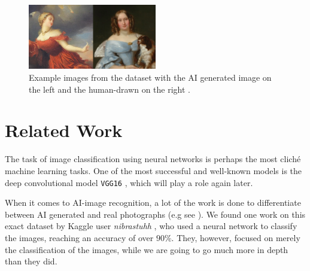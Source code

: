 \begin{figure}[H]
    \centering
    \includegraphics[width=0.5\textwidth]{images/Example_images.png}
    \caption{Example images from the dataset with the AI generated image on the left and the human-drawn on the right \cite{aiartbench}.}
    \label{fig:example_images}
\end{figure}

\section{Related Work}

The task of image classification using neural networks is perhaps the most cliché machine learning tasks.
One of the most successful and well-known models is the deep convolutional model \texttt{VGG16} \cite{VGG16source}, which will play a role again later.

When it comes to AI-image recognition, a lot of the work is done to differentiate between AI generated and real photographs (e.g see \cite{photos_example}).
We found one work on this exact dataset by Kaggle user \textit{nibrastuhh} \cite{useraiartbench}, who used
a neural network to classify the images, reaching an accuracy of over $90\%$.
They, however, focused on merely the classification of the images, while we are going to go much more in depth than they did.


